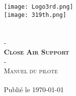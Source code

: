 \thispagestyle{empty}

\begin{center}
    \null
    \vfill
    \texttt{[image: Logo3rd.png]}\\[4ex]
    \texttt{[image: 319th.png]}\\[1ex]
    {\Large \rgt{}}\\[1ex]
    {\Large \inmem{}}\\[2ex]
    {\Large - }\\[2ex]
    {\fontsize{40}{60}\selectfont \textbf{\textsc{Close Air Support}}}\\[2ex]
    {\Large - }\\[2ex]
    {\Large \textsc{Manuel du pilote}}\\[2ex]
    \vskip2cm %
    {\large \version }\\[2ex]
    \vskip5mm %
    {\large Publié le \today}\\[2ex]
    \vfill
\end{center}